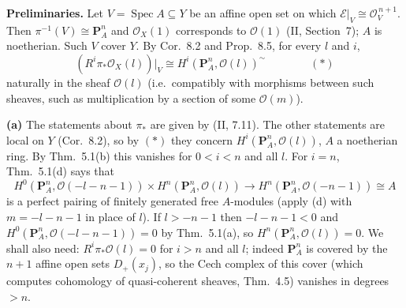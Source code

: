 \documentclass[11pt]{article}
\begin{document}
\pf
\textbf{Preliminaries.} Let $V=\operatorname{Spec}A\subseteq Y$ be an affine open set on which $\mathcal E|_V\cong\mathcal O_V^{\,n+1}$. Then $\pi^{-1}(V)\cong\mathbf P^n_A$ and $\mathcal O_X(1)$ corresponds to $\mathcal O(1)$ (II, Section~7); $A$ is noetherian. Such $V$ cover $Y$. By Cor.~8.2 and Prop.~8.5, for every $l$ and $i$,
\[
(R^i\pi_*\mathcal O_X(l))|_V\cong H^i(\mathbf P^n_A,\mathcal O(l))^{\sim}\qquad\qquad(*)
\]
naturally in the sheaf $\mathcal O(l)$ (i.e.\ compatibly with morphisms between such sheaves, such as multiplication by a section of some $\mathcal O(m)$).

\textbf{(a)} The statements about $\pi_*$ are given by (II, 7.11). The other statements are local on $Y$ (Cor.~8.2), so by $(*)$ they concern $H^i(\mathbf P^n_A,\mathcal O(l))$, $A$ a noetherian ring. By Thm.~5.1(b) this vanishes for $0<i<n$ and all $l$. For $i=n$, Thm.~5.1(d) says that
\[
H^0(\mathbf P^n_A,\mathcal O(-l-n-1))\times H^n(\mathbf P^n_A,\mathcal O(l))\to H^n(\mathbf P^n_A,\mathcal O(-n-1))\cong A
\]
is a perfect pairing of finitely generated free $A$-modules (apply (d) with $m=-l-n-1$ in place of $l$). If $l>-n-1$ then $-l-n-1<0$ and $H^0(\mathbf P^n_A,\mathcal O(-l-n-1))=0$ by Thm.~5.1(a), so $H^n(\mathbf P^n_A,\mathcal O(l))=0$. We shall also need: $R^i\pi_*\mathcal O(l)=0$ for $i>n$ and all $l$; indeed $\mathbf P^n_A$ is covered by the $n+1$ affine open sets $D_+(x_j)$, so the Cech complex of this cover (which computes cohomology of quasi-coherent sheaves, Thm.~4.5) vanishes in degrees $>n$.
\end{document}
